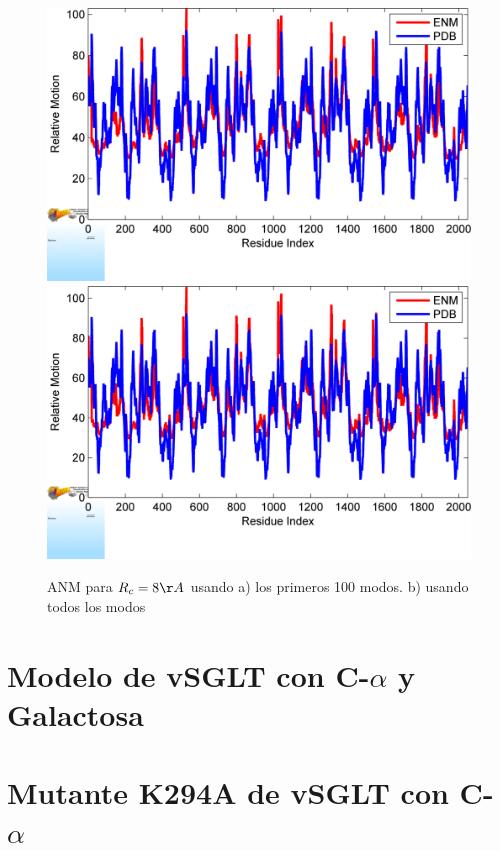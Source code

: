 \begin{figure}
 \centering
  \includegraphics[scale=0.3]{./Kap4/ANM/Ca/BF_plot_100.png}
 \includegraphics[scale=0.3]{./Kap4/ANM/Ca/BF_plot.png}
 \caption{ANM para $R_c=8\AA$ usando a) los primeros 100 modos. b) usando todos los modos}
\end{figure}
\section{Modelo de vSGLT con C-$\alpha$ y Galactosa}

\section{Mutante K294A de vSGLT con C-$\alpha$}